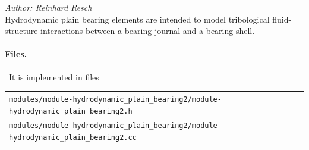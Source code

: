 %
%
%
%
%
%
%
%
\emph{Author: Reinhard Resch} \\
Hydrodynamic plain bearing elements are intended to model tribological fluid-structure interactions between a bearing journal and a bearing shell.
\paragraph{Files.} \
It is implemented in files\\
\begin{tabular}{l}
  \texttt{modules/module-hydrodynamic\_plain\_bearing2/module-hydrodynamic\_plain\_bearing2.h} \\
  \texttt{modules/module-hydrodynamic\_plain\_bearing2/module-hydrodynamic\_plain\_bearing2.cc}
\end{tabular}

